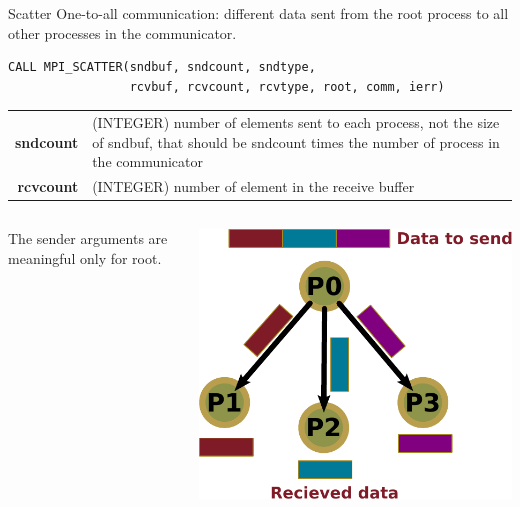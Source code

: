 \documentclass[aspectratio=43]{beamer}
\begin{document}
\begin{frame}[fragile]{Scatter}
One-to-all communication: different data sent from the root process to all other processes in the communicator.\\
\footnotesize
\begin{verbatim}
CALL MPI_SCATTER(sndbuf, sndcount, sndtype,
                 rcvbuf, rcvcount, rcvtype, root, comm, ierr)
\end{verbatim}
\normalsize
\begin{black1block}{}
\begin{tabular}{rp{8cm}}
\textbf{sndcount} & (INTEGER) number of elements sent to each process, not the size of sndbuf, that should be sndcount times the number of process in the communicator\\
\textbf{rcvcount} & (INTEGER) number of element in the receive buffer\\
\end{tabular}
\end{black1block}
\begin{columns}
    \begin{column}{0.7\paperwidth}
        \hspace{1cm}The sender arguments are meaningful only for root.
    \end{column}
    \begin{column}{0.3\paperwidth}
    \includegraphics[scale=0.3]{03.MPI_Coll/scatter.pdf}\\
    \end{column}
\end{columns}
\end{frame}
\end{document}
